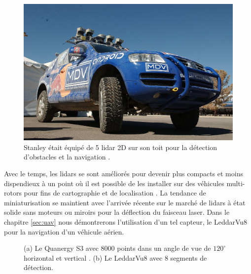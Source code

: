 \begin{figure}[ht]
  \centering
  \includegraphics[width=0.5\linewidth]{images/stanley.jpg}
  \caption[Stanley la voiture autonome fonctionnant par lidar.]{Stanley était équipé de 5 lidar 2D sur son toit pour la détection d'obstacles et la navigation \citep{thrun2006stanley}.}
  \label{fig:stanley}
\end{figure}

Avec le temps, les lidars se sont améliorés pour devenir plus compacts et moins dispendieux à un point où il est possible de les installer sur des véhicules multi-rotors pour fins de cartographie et de localisation \citep{zhang2018aerial}. La tendance de miniaturisation se maintient avec l'arrivée récente sur le marché de lidars à état solide sans moteurs ou miroirs pour la déflection du faisceau laser. Dans le chapitre \ref{sec:uav} nous démontrerons l'utilisation d'un tel capteur, le LeddarVu8 pour la navigation d'un véhicule aérien.

\begin{figure}[!h]
  \centering
  \caption[Lidars à état solide]{
    (a) Le Quanergy S3 avec $8000$ points dans un angle de vue de $120^\circ$ horizontal et vertical \citep{eldada2016}.
    (b) Le LeddarVu8 avec $8$ segments de détection.
  }
  \label{fig:lidars}
\end{figure}

